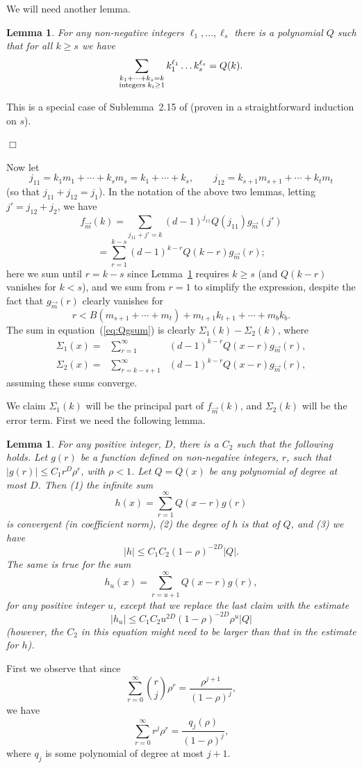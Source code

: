 \documentclass[12pt]{article}
\newtheorem{lemma}[theorem]{Lemma}
\newcommand{\proof}{{\par\noindent {\bf Proof}\space\space}}
\newcommand{\proofbox}{\begin{flushright}$\Box$\end{flushright}}
\begin{document}
We will need another lemma.
\begin{lemma}\label{lm:Q}
For any non-negative integers $\ell_1,\ldots,\ell_s$ there is
a polynomial $Q$ such that for
all $k\ge s$ we have
$$
\sum_{\substack{k_1+\cdots+k_s=k\\ {\rm integers}\;k_i\ge 1}} 
k_1^{\ell_1}\ldots k_s^{\ell_s} = Q(k).
$$
\end{lemma}
\proof This is a special case of Sublemma~2.15 of \cite{friedman_random_graphs}
(proven in a straightforward induction on $s$).
\proofbox

Now let 
$$
j_{11}=k_1m_1+\cdots+k_sm_s=k_1+\cdots+k_s, \qquad
j_{12}=k_{s+1}m_{s+1}+\cdots+k_tm_t
$$
(so that $j_{11}+j_{12}=j_1$).  In the notation of the above two lemmas,
letting $j'=j_{12}+j_2$,
we have
$$
f_{\vec m}(k) = \sum_{j_{11}+j'=k} (d-1)^{j_{11}} Q(j_{11})
g_{\vec m}(j')
$$
\begin{equation}\label{eq:Qgsum}
= \sum_{r=1}^{k-s} (d-1)^{k-r} Q(k-r) g_{\vec m}(r);
\end{equation}
here we sum until $r=k-s$ since Lemma~\ref{lm:Q} requires $k\ge s$ (and
$Q(k-r)$ vanishes for $k<s$), and we
sum from $r=1$ to simplify the expression,
despite the fact that $g_{\vec m}(r)$ clearly vanishes
for 
$$
r<B(m_{s+1}+\cdots+m_t)+m_{t+1}k_{t+1}+\cdots+m_bk_b.
$$
The
sum in equation~(\ref{eq:Qgsum}) is clearly $\Sigma_1(k)-\Sigma_2(k)$, where
\begin{eqnarray*}
\Sigma_1(x) =& \sum_{r=1}^{\infty} &(d-1)^{k-r} Q(x-r) g_{\vec m}(r), \\
\Sigma_2(x) =& \sum_{r=k-s+1}^{\infty}& (d-1)^{k-r} Q(x-r) g_{\vec m}(r),
\end{eqnarray*}
assuming these sums converge.

We claim $\Sigma_1(k)$ will be the principal part of $f_{\vec m}(k)$,
and $\Sigma_2(k)$ will be the error term.  First we need the following
lemma.

\begin{lemma}\label{lm:useful_aux}
For any positive integer, $D$, there is a $C_2$ such that the following
holds.
Let $g(r)$ be a function defined on non-negative integers, $r$,
such that $|g(r)|\le C_1r^D\rho^r$, with $\rho<1$.  Let $Q=Q(x)$ 
be any polynomial
of degree at most $D$.
Then (1) the infinite sum
$$
h(x) = \sum_{r=1}^\infty Q(x-r) g(r)
$$
is convergent (in coefficient norm), (2) the degree of $h$ is that of $Q$, and
(3) we have
$$
|h|\le C_1C_2(1-\rho)^{-2D} |Q|.
$$
The same is true for the
sum
$$
h_u(x) = \sum_{r=u+1}^\infty Q(x-r) g(r),
$$
for any positive integer $u$, except that we replace the last claim with
the estimate
$$
|h_u|\le C_1C_2u^{2D}(1-\rho)^{-2D}\rho^u|Q|
$$
(however, the $C_2$ in this equation might need to be larger than that
in the estimate for $h$).
\end{lemma}
\proof 
First we observe that since
$$
\sum_{r=0}^\infty \binom{r}{j}\rho^r = \frac{\rho^{j+1}}{(1-\rho)^j},
$$
we have
$$
\sum_{r=0}^\infty r^j\rho^r = \frac{q_j(\rho)}{(1-\rho)^j},
$$
where $q_j$ is some polynomial of degree at most $j+1$.
\end{document}

